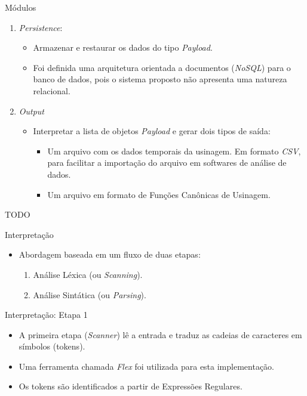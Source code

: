 \documentclass[aspectratio=169]{beamer}
\begin{document}
{\begin{frame}{Módulos}
\begin{enumerate}
    \item {
      \emph{Persistence}:
      \begin{itemize}
        \item Armazenar e restaurar os dados do tipo \emph{Payload}.
        \item Foi definida uma arquitetura orientada a documentos 
              (\emph{NoSQL}) para o banco de dados, pois o sistema 
              proposto não apresenta uma natureza relacional.
      \end{itemize}
    }

    \item {
      \emph{Output}
      \begin{itemize}
        \item Interpretar a lista de objetos \emph{Payload} 
              e gerar dois tipos de saída:
        \begin{itemize}
              \item Um arquivo com os dados temporais da usinagem. 
                    Em formato \emph{CSV}, para facilitar a importação 
                    do arquivo em softwares de análise de dados.
              \item Um arquivo em formato de Funções Canônicas de Usinagem.
        \end{itemize}
      \end{itemize}
    }

  \end{enumerate}
\end{frame}

TODO

\begin{frame}{Interpretação}
  \begin{itemize}
    \item Abordagem baseada em um fluxo de duas etapas:
    \begin{enumerate}
      \item Análise Léxica (ou \emph{Scanning}).
      \item Análise Sintática (ou \emph{Parsing}).
    \end{enumerate}
  \end{itemize}
\end{frame}


\begin{frame}{Interpretação: Etapa 1}
  \begin{itemize}
    \item A primeira etapa (\emph{Scanner}) l\^e a entrada e traduz as 
          cadeias de caracteres em símbolos (tokens). 
    \item Uma ferramenta chamada \emph{Flex} foi utilizada para esta 
          implementa\c c\~ao.
    \item Os tokens são identificados a partir de Expressões Regulares.
  \end{itemize}
\end{frame}


}
\end{document}
